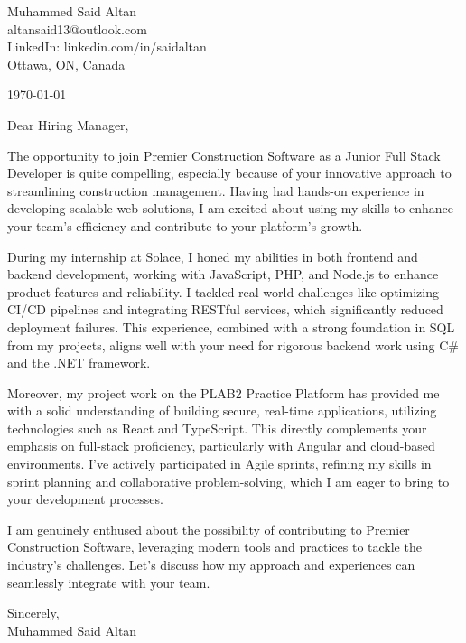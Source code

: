 \documentclass[11pt,a4paper]{article}
\begin{document}
\begin{flushright}
Muhammed Said Altan\\[0.3em]
altansaid13@outlook.com\\[0.3em]
LinkedIn: linkedin.com/in/saidaltan\\[0.3em]
Ottawa, ON, Canada
\end{flushright}

\vspace{1em}

\begin{flushleft}
\today
\end{flushleft}

\vspace{1em}

Dear Hiring Manager,

The opportunity to join Premier Construction Software as a Junior Full Stack Developer is quite compelling, especially because of your innovative approach to streamlining construction management. Having had hands-on experience in developing scalable web solutions, I am excited about using my skills to enhance your team’s efficiency and contribute to your platform's growth.

During my internship at Solace, I honed my abilities in both frontend and backend development, working with JavaScript, PHP, and Node.js to enhance product features and reliability. I tackled real-world challenges like optimizing CI/CD pipelines and integrating RESTful services, which significantly reduced deployment failures. This experience, combined with a strong foundation in SQL from my projects, aligns well with your need for rigorous backend work using C# and the .NET framework.

Moreover, my project work on the PLAB2 Practice Platform has provided me with a solid understanding of building secure, real-time applications, utilizing technologies such as React and TypeScript. This directly complements your emphasis on full-stack proficiency, particularly with Angular and cloud-based environments. I’ve actively participated in Agile sprints, refining my skills in sprint planning and collaborative problem-solving, which I am eager to bring to your development processes.

I am genuinely enthused about the possibility of contributing to Premier Construction Software, leveraging modern tools and practices to tackle the industry's challenges. Let’s discuss how my approach and experiences can seamlessly integrate with your team.

Sincerely,\\[2em]
Muhammed Said Altan
\end{document}
